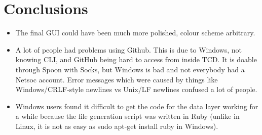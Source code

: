 \section{Conclusions}
\begin{itemize}
\item The final GUI could have been much more polished, colour scheme arbitrary.
\item A lot of people had problems using Github. This is due to Windows, not knowing CLI, and GitHub being hard to access from inside TCD. It is doable through Spoon with Socks, but Windows is bad and not everybody had a Netsoc account. Error messages which were caused by things like Windows/CRLF-style newlines vs Unix/LF newlines confused a lot of people.
\item Windows users found it difficult to get the code for the data layer working for a while because the file generation script was written in Ruby (unlike in Linux, it is not as easy as sudo apt-get install ruby in Windows).
\end{itemize}
